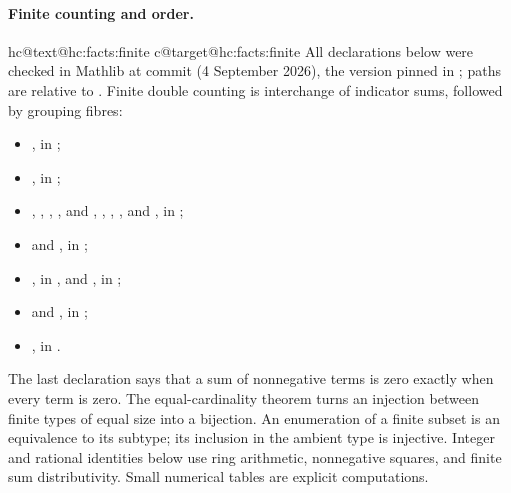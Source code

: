 \documentclass[11pt]{amsart}
\makeatletter
\let\hcSavedLabel\label
\renewcommand{\label}[1]{%
  \hcSavedLabel{#1}%
  \expandafter\protected@xdef\csname hc@text@#1\endcsname{\@currentlabel}%
  \expandafter\xdef\csname hc@target@#1\endcsname{\@currentHref}}
\makeatother
\begin{document}
\paragraph{Finite counting and order.}\makeatletter{}\makeatother\label{hc:facts:finite}
\uses{}
All declarations below were checked in Mathlib at commit
 (4 September 2026), the version pinned in
; paths are relative to . Finite double counting is
interchange of indicator sums, followed by grouping fibres:
\begin{itemize}
 \item {}, in
 ;
 \item {}, in
 ;
 \item {},
 ,
 , , and
 , ,
 , , and
 , in ;
 \item {} and
 , in ;
 \item {}, in ,
 and , in ;
 \item {} and , in
 ;
 \item {}, in
 .
\end{itemize}
The last declaration says that a sum of nonnegative terms is zero
exactly when every term is zero. The equal-cardinality theorem turns
an injection between finite types of equal size into a bijection.
An enumeration of a finite subset is an equivalence to its subtype;
its inclusion in the ambient type is injective. Integer and rational
identities below use ring arithmetic, nonnegative squares, and finite
sum distributivity. Small numerical tables are explicit computations.
\end{document}
